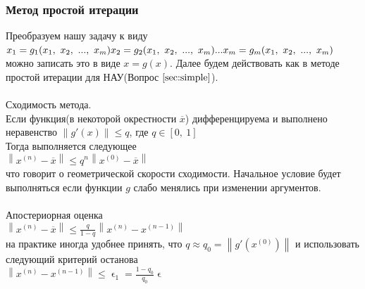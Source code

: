 \documentclass[16pt]{article}
\begin{document}
            \subsubsection{Метод простой итерации}
            Преобразуем нашу задачу к виду\\
            $
            x_1 = g_1(x_1,\ x_2,\ ...,\ x_m)\\
            x_2 = g_2(x_1,\ x_2,\ ...,\ x_m)\\
            ...\\
            x_m = g_m(x_1,\ x_2,\ ...,\ x_m)\\
            $\\
            можно записать это в виде $x = g(x)$. Далее будем действовать как в методе простой итерации для НАУ(Вопрос $\ref{sec:simple}$).\\ \\
            Сходимость метода.\\
            Если функция(в некоторой окрестности $\overline{x}$) дифференцируема и выполнено неравенство $\left\| g'(x) \right\| \leq q$, где $q\in[0,\ 1]$\\
            Тогда выполняется следующее\\
            $\left\|x^{(n)}-\overline{x}\right\| \leq q^{n}\left\|x^{(0)}-\overline{x}\right\|$\\
            что говорит о геометрической скорости сходимости. Начальное условие будет выполняться если функции $g$ слабо менялись при изменении аргументов.\\ \\
            Апостериорная оценка\\
            $\left\|x^{(n)}-\overline{x}\right\| \leq \frac{q}{1-q} \left\|x^{(n)}-x^{(n-1)}\right\|$\\
            на практике иногда удобнее принять, что $q\approx q_0 = \left\|g'(x^{(0)})\right\|$ и использовать следующий критерий останова\\
            $\left\|x^{(n)}-x^{(n-1)}\right\| \leq \upvarepsilon_1 = \frac{1-q_0}{q_0}\upvarepsilon$\\
\end{document}

